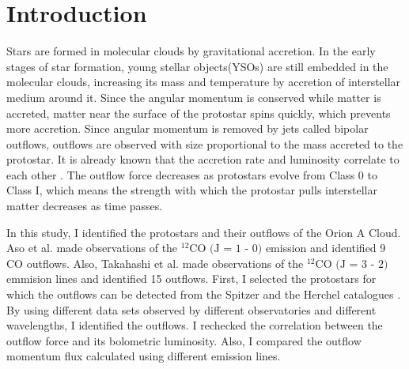 
\section{Introduction}

Stars are formed in molecular clouds by gravitational accretion. In the early stages of star formation, young stellar objects(YSOs) are still embedded in the molecular clouds, increasing its mass and temperature by accretion of interstellar medium around it. Since the angular momentum is conserved while matter is accreted, matter near the surface of the protostar spins quickly, which prevents more accretion. Since angular momentum is removed by jets called bipolar outflows, outflows are observed with size proportional to the mass accreted to the protostar\cite{bontemps1996evolution}. 
It is already known that the accretion rate and luminosity correlate to each other \cite{kang2013outflow}. The outflow force decreases as protostars evolve from Class 0 to Class I, which means the strength with which the protostar pulls interstellar matter decreases as time passes. 

In this study, I identified the protostars and their outflows of the Orion A Cloud. Aso et al. \cite{aso2000dense} made observations of the $^{12}\textrm{CO (J = 1 - 0)}$ emission and identified 9 CO outflows. Also, Takahashi et al. \cite{takahashi2008millimeter} made observations of the $^{12}\textrm{CO (J = 3 - 2)}$ emmision lines and identified 15 outflows. First, I selected the protostars for which the outflows can be detected from the Spitzer and the Herchel catalogues \cite{megeath2012spitzer, furlan2016herschel}. By using different data sets observed by different observatories and different wavelengths, I identified the outflows. I rechecked the correlation between the outflow force and its bolometric luminosity. Also, I compared the outflow momentum flux calculated using different emission lines. \\
